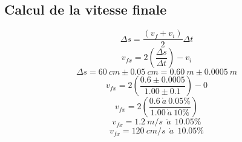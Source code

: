 \documentclass{article}
\begin{document}
            \subsection{Calcul de la vitesse finale}
                \setcounter{equation}{0}
                \vspace{5mm}
                \begin{equation}
                    \Delta s = \frac{(v_f+v_i)}{2}  \Delta t
                \end{equation}
                \vspace{5mm}
                \begin{equation}
                    v_{fx} = 2 \left( \frac{\Delta s}{\Delta t} \right) - v_i
                \end{equation}
                 \vspace{5mm}
                \begin{equation}
                    \Delta s = 60 \ cm \pm 0.05 \ cm = 0.60 \ m \pm 0.0005 \ m
                \end{equation}
                \vspace{5mm}
                \begin{equation}
                    v_{fx} = 2 \left( \frac{0.6  \pm 0.0005}{1.00 \pm 0.1} \right) - 0
                \end{equation}
                \vspace{5mm}
                \begin{equation}
                    v_{fx} = 2 \left( \frac{0.6 \ \grave{a} \ 0.05 \% }{1.00 \ \grave{a} \ 10\% } \right)
                \end{equation}
                \vspace{5mm}
                \begin{equation}
                    v_{fx} = 1.2 \ m/s \ \ \grave{a} \ \ 10.05 \%
                \end{equation}
                \vspace{5mm}
                \begin{equation}
                    v_{fx} = 120 \ cm/s \ \ \grave{a} \ \ 10.05 \%
                \end{equation}
                \vspace{10mm}
                \newpage
\end{document}

